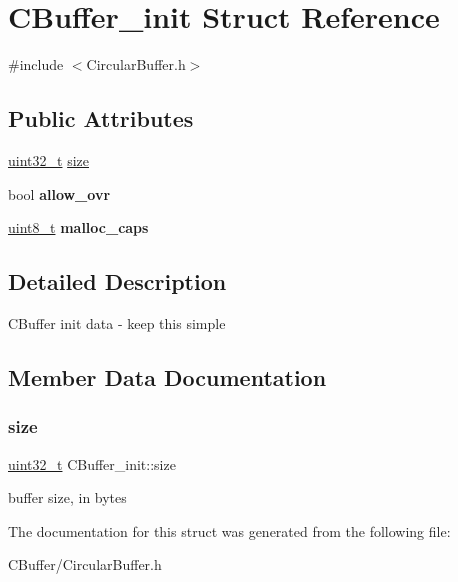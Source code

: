 \hypertarget{structCBuffer__init}{}\section{C\+Buffer\+\_\+init Struct Reference}
\label{structCBuffer__init}


{\ttfamily \#include $<$Circular\+Buffer.\+h$>$}

\subsection*{Public Attributes}
\begin{DoxyCompactItemize}
\item 
\hyperlink{vl53l0x__types_8h_a435d1572bf3f880d55459d9805097f62}{uint32\+\_\+t} \hyperlink{structCBuffer__init_add2e72113e8fb67c3364821e36c57e73}{size}
\item 
\mbox{\label{structCBuffer__init_a12b817b0ea9d3e3134f094a03cf84aad}} 
bool {\bfseries allow\+\_\+ovr}
\item 
\mbox{\label{structCBuffer__init_a7d684a91ec39969c0a231ad19f9321a4}} 
\hyperlink{vl53l0x__types_8h_aba7bc1797add20fe3efdf37ced1182c5}{uint8\+\_\+t} {\bfseries malloc\+\_\+caps}
\end{DoxyCompactItemize}


\subsection{Detailed Description}
C\+Buffer init data -\/ keep this simple 

\subsection{Member Data Documentation}
\mbox{\label{structCBuffer__init_add2e72113e8fb67c3364821e36c57e73}} 
\subsubsection{\texorpdfstring{size}{size}}
{\footnotesize\ttfamily \hyperlink{vl53l0x__types_8h_a435d1572bf3f880d55459d9805097f62}{uint32\+\_\+t} C\+Buffer\+\_\+init\+::size}

buffer size, in bytes 

The documentation for this struct was generated from the following file\+:\begin{DoxyCompactItemize}
\item 
C\+Buffer/Circular\+Buffer.\+h\end{DoxyCompactItemize}

